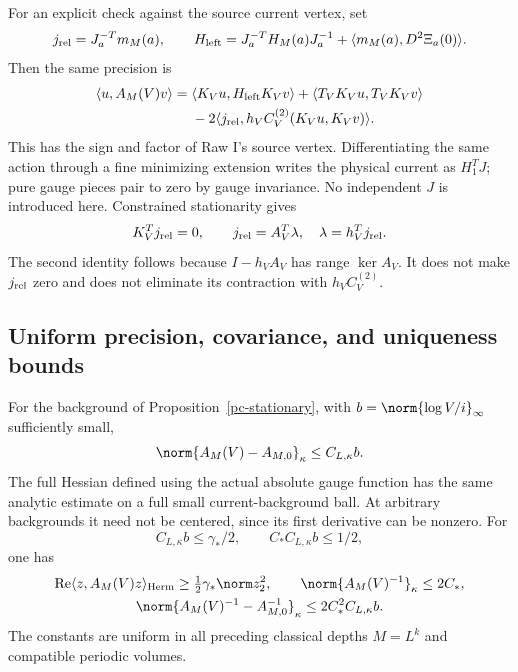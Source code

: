 For an explicit check against the source current vertex, set
\[
 j_{\rm rel}=J_a^{-T}m_M(a),\qquad
 H_{\rm left}=J_a^{-T}H_M(a)J_a^{-1}
                     +\langle m_M(a),D^2\Xi_a(0)\rangle.
\]
Then the same precision is
\begin{equation}\label{pc-source-current-form}
 \begin{split}
 \langle u,A_M(V)v\rangle={}&
 \langle K_Vu,H_{\rm left}K_Vv\rangle
 +\langle T_VK_Vu,T_VK_Vv\rangle\\
 &-2\langle j_{\rm rel},h_VC_V^{(2)}(K_Vu,K_Vv)\rangle.
 \end{split}
\end{equation}
This has the sign and factor of Raw I's source vertex.
Differentiating the same action through a fine minimizing
extension writes the physical current as $H_1^TJ$; pure gauge
pieces pair to zero by gauge invariance. No independent $J$
is introduced here. Constrained stationarity gives
\begin{equation}\label{pc-current-stationarity}
 K_V^Tj_{\rm rel}=0,\qquad
 j_{\rm rel}=A_V^T\lambda,\quad \lambda=h_V^Tj_{\rm rel}.
\end{equation}
The second identity follows because $I-h_VA_V$ has range
$\ker A_V$. It does not make $j_{\rm rel}$ zero and does
not eliminate its contraction with $h_VC_V^{(2)}$.

\subsection{Uniform precision, covariance, and uniqueness bounds}
\label{pc-bounds-section}

\begin{theorem}
\label{pc-precision-theorem}
For the background of Proposition~\ref{pc-stationary}, with
$b=\norm{\log V/i}_\infty$ sufficiently small,
\begin{equation}\label{pc-precision-perturbation}
 \norm{A_M(V)-A_{M,0}}_\kappa\le C_{L,\kappa}b.
\end{equation}
The full Hessian defined using the actual absolute gauge
function has the same analytic estimate on a full small
current-background ball. At arbitrary backgrounds it need
not be centered, since its first derivative can be nonzero.
For
\begin{equation}\label{pc-radius}
 C_{L,\kappa}b\le\gamma_*/2,\qquad
 C_*C_{L,\kappa}b\le1/2,
\end{equation}
one has
\begin{equation}\label{pc-inverse-bounds}
 \begin{gathered}
 \operatorname{Re}\langle z,A_M(V)z\rangle_{\rm Herm}
       \ge\tfrac12\gamma_*\norm z_2^2,\qquad
 \norm{A_M(V)^{-1}}_\kappa\le2C_*,\\
 \norm{A_M(V)^{-1}-A_{M,0}^{-1}}_\kappa
       \le2C_*^2C_{L,\kappa}b.
 \end{gathered}
\end{equation}
The constants are uniform in all preceding classical depths
$M=L^k$ and compatible periodic volumes.
\end{theorem}

